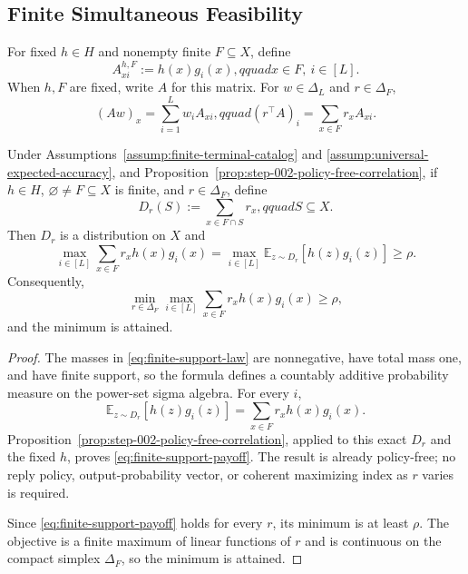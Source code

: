 \subsection{Finite Simultaneous Feasibility}
\label{app:finite-simultaneous-feasibility}

For fixed $h\in H$ and nonempty finite $F\subseteq X$, define
\begin{equation}\label{eq:finite-payoff-matrix}
A^{h,F}_{xi}:=h(x)g_i(x),qquad x\in F,\ i\in[L].
\end{equation}
When $h,F$ are fixed, write $A$ for this matrix.  For
$w\in\Delta_L$ and $r\in\Delta_F$,
\[
(Aw)_x=\sum_{i=1}^Lw_iA_{xi},qquad
(r^\top A)_i=\sum_{x\in F}r_xA_{xi}.
\]

\begin{lemma}
\label{lem:step-003-finite-support-payoff}
Under Assumptions~\ref{assump:finite-terminal-catalog} and
\ref{assump:universal-expected-accuracy}, and
Proposition~\ref{prop:step-002-policy-free-correlation}, if $h\in H$,
$\varnothing\ne F\subseteq X$ is finite, and $r\in\Delta_F$, define
\begin{equation}\label{eq:finite-support-law}
D_r(S):=\sum_{x\in F\cap S}r_x,qquad S\subseteq X.
\end{equation}
Then $D_r$ is a distribution on $X$ and
\begin{equation}\label{eq:finite-support-payoff}
\max_{i\in[L]}\sum_{x\in F}r_xh(x)g_i(x)
=\max_{i\in[L]}\mathbb E_{z\sim D_r}[h(z)g_i(z)]
\ge\rho.
\end{equation}
Consequently,
\begin{equation}\label{eq:finite-row-value}
\min_{r\in\Delta_F}\max_{i\in[L]}
\sum_{x\in F}r_xh(x)g_i(x)\ge\rho,
\end{equation}
and the minimum is attained.
\end{lemma}

\begin{proof}
The masses in \eqref{eq:finite-support-law} are nonnegative, have total mass
one, and have finite support, so the formula defines a countably additive
probability measure on the power-set sigma algebra.  For every $i$,
\[
\mathbb E_{z\sim D_r}[h(z)g_i(z)]
=\sum_{x\in F}r_xh(x)g_i(x).
\]
Proposition~\ref{prop:step-002-policy-free-correlation}, applied to this exact
$D_r$ and the fixed $h$, proves \eqref{eq:finite-support-payoff}.  The result
is already policy-free; no reply policy, output-probability vector, or
coherent maximizing index as $r$ varies is required.

Since \eqref{eq:finite-support-payoff} holds for every $r$, its minimum is at
least $\rho$.  The objective is a finite maximum of linear functions of $r$
and is continuous on the compact simplex $\Delta_F$, so the minimum is
attained.
\end{proof}


